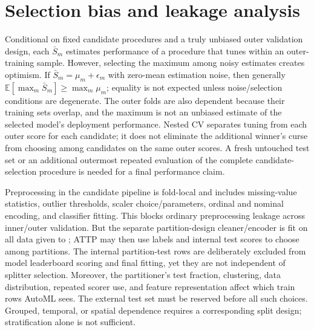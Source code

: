 ﻿\documentclass[conference]{IEEEtran}
\begin{document}
\section{Selection bias and leakage analysis}
Conditional on fixed candidate procedures and a truly unbiased outer validation design, each \(\bar S_m\) estimates performance of a procedure that tunes within an outer-training sample. However, selecting the maximum among noisy estimates creates optimism. If \(\bar S_m=\mu_m+\epsilon_m\) with zero-mean estimation noise, then generally \(\mathbb E[\max_m\bar S_m]\ge\max_m\mu_m\); equality is not expected unless noise/selection conditions are degenerate. The outer folds are also dependent because their training sets overlap, and the maximum is not an unbiased estimate of the selected model's deployment performance. Nested CV separates tuning from each outer score for each candidate; it does not eliminate the additional winner's curse from choosing among candidates on the same outer scores. A fresh untouched test set or an additional outermost repeated evaluation of the complete candidate-selection procedure is needed for a final performance claim.

Preprocessing in the candidate pipeline is fold-local and includes missing-value statistics, outlier thresholds, scaler choice/parameters, ordinal and nominal encoding, and classifier fitting. This blocks ordinary preprocessing leakage across inner/outer validation. But the separate partition-design cleaner/encoder is fit on all data given to ; ATTP may then use labels and internal test scores to choose among partitions. The internal partition-test rows are deliberately excluded from model leaderboard scoring and final fitting, yet they are not independent of splitter selection. Moreover, the partitioner's test fraction, clustering, data distribution, repeated scorer use, and feature representation affect which train rows AutoML sees. The external test set must be reserved before all such choices. Grouped, temporal, or spatial dependence requires a corresponding split design; stratification alone is not sufficient.
\end{document}
